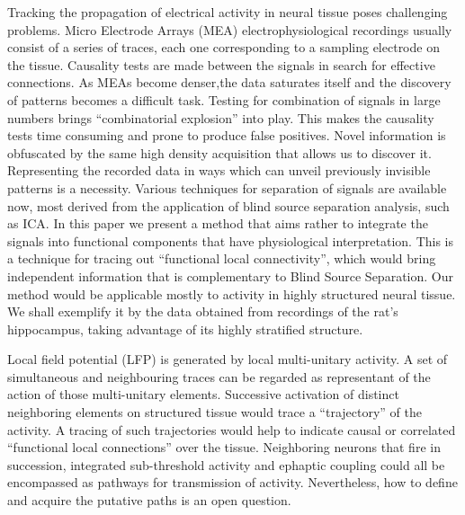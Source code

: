 \documentclass[utf8]{frontiersSCNS}
\begin{document}
Tracking the propagation of electrical activity in neural tissue poses challenging
problems. 
Micro Electrode Arrays (MEA) electrophysiological recordings usually consist of 
a series of traces, each one corresponding to a sampling
electrode on the tissue. Causality tests are made between the
signals in search for effective connections. 
As MEAs become denser,the data saturates itself
and the discovery of patterns becomes a difficult task.
Testing for combination of signals in large numbers
brings ``combinatorial explosion'' into
play. This makes the causality tests time consuming and
prone to produce false positives.
Novel information is obfuscated by the same high density acquisition that allows us to
discover it. Representing  the recorded data in ways which can unveil previously
invisible patterns is a necessity. Various techniques for separation of signals
are available now, most derived from the application of blind source
separation analysis, such as ICA.
In this paper we present a method that aims rather to integrate
the signals into functional components that
have physiological interpretation.
This is a technique for tracing out
``functional local connectivity'', which would bring independent information
that is complementary to Blind Source Separation.
Our  method would be applicable mostly to
activity in highly structured neural tissue. We shall exemplify it by
the data obtained from recordings of the rat's hippocampus,
taking advantage of its highly stratified  structure. 

Local field potential (LFP)
is generated by local multi-unitary activity.
A set of simultaneous and neighbouring traces
can be regarded as representant of the action
of those multi-unitary elements. 
Successive activation  of distinct neighboring elements on structured
tissue would trace a
``trajectory'' of the activity. A tracing of such trajectories would help to indicate
causal or correlated ``functional local connections'' over the tissue. Neighboring
neurons that fire in succession, integrated sub-threshold activity and ephaptic coupling
could all be encompassed as pathways for transmission of activity. Nevertheless,
how to define and acquire the putative paths is an open question.
\end{document}

